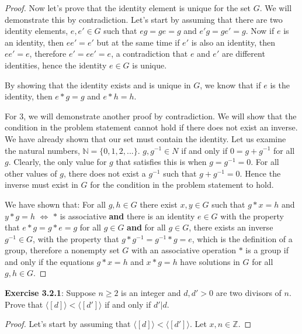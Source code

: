\documentclass[a4paper]{article}
\begin{document}
\begin{myparindent}{0pt}
\begin{proof}
  Now let's prove that the identity element is unique for the set $G$.
  We will demonstrate this by contradiction.
  Let's start by assuming that there are two identity elements, $e, e' \in G$
  such that $eg = ge = g$ and $e'g = ge' = g$. Now if $e$ is an identity, then
  $ee' = e'$ but at the same time if $e'$ is also an identity, then $ee' = e$,
  therefore $e' = ee' = e$, a contradiction that $e$ and $e'$ are different
  identities, hence the identity $e \in G$ is unique. \newline

  By showing that the identity exists and is unique in $G$, we know that if $e$ is the
  identity, then $e * g = g$ and $e * h = h$. \newline

  For 3, we will demonstrate another proof by contradiction. We will show that
  the condition in the problem statement cannot hold if there does not exist
  an inverse. We have already shown that our set must contain the identity.
  Let us examine the natural numbers, $\mathbb{N} = \{ 0, 1, 2, ... \}$.
  $g, g^{-1} \in N$ if and only if $0 = g + g^{-1}$ for all $g$. Clearly, the only
  value for $g$ that satisfies this is when $g = g^{-1} = 0$. For all other
  values of $g$, there does not exist a $g^{-1}$ such that $g + g^{-1} = 0$.
  Hence the inverse must exist in $G$ for the condition in the problem statement
  to hold. \newline

  We have shown that: \newline
  For all $g, h \in G$ there exist $x, y \in G$ such that $g * x = h$ and $y * g = h$
  $\iff$ $*$ is associative \textbf{and} there is an identity $e \in G$ with the
  property that $e * g = g * e = g$ for all $g \in G$ \textbf{and} for all
  $g \in G$, there exists an inverse $g^{-1} \in G$, with the property that
  $g * g^{-1} = g^{-1} * g = e$, which is the definition of a group, therefore
  a nonempty set $G$ with an associative operation $*$ is a group if
  and only if the equations $g * x = h$ and $x * g = h$ have solutions in $G$
  for all $g, h \in G$.

\end{proof}


\textbf{Exercise 3.2.1}:
Suppose $n \ge 2$ is an integer and $d, d' > 0$ are two divisors of $n$. Prove
that $\langle [d] \rangle < \langle [d'] \rangle$ if and only if $d'|d$.
\newline

\begin{proof}
Let's start by assuming that $\langle [d] \rangle < \langle [d'] \rangle$.
Let $x, n \in \mathbb{Z}$.


\end{proof}
\end{myparindent}
\end{document}
